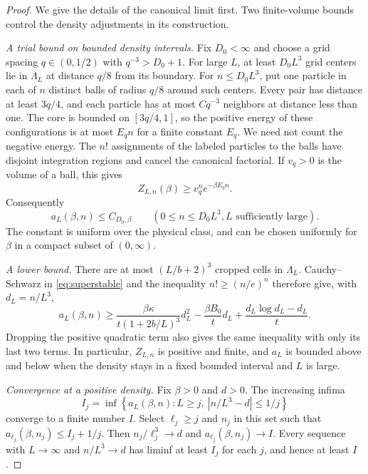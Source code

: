 \begin{proof}
We give the details of the canonical limit first. Two finite-volume
bounds control the density adjustments in its construction.

\emph{A trial bound on bounded density intervals.}
Fix $D_0<\infty$ and choose a grid spacing $q\in(0,1/2)$ with
$q^{-3}>D_0+1$. For large $L$, at least $D_0L^3$ grid centers lie
in $\Lambda_L$ at distance $q/8$ from its boundary. For
$n\le D_0L^3$, put one particle in each of $n$ distinct balls of
radius $q/8$ around such centers. Every pair has distance at least
$3q/4$, and each particle has at most $Cq^{-3}$ neighbors at distance
less than one. The core is bounded on $[3q/4,1]$, so the positive
energy of these configurations is at most $E_q n$ for a finite
constant $E_q$. We need not count the negative energy. The $n!$
assignments of the labeled particles to the balls have disjoint
integration regions and cancel the canonical factorial. If $v_q>0$
is the volume of a ball, this gives
\[
 Z_{L,n}(\beta)\ge v_q^n e^{-\beta E_q n}.
\]
Consequently
\begin{equation}
 a_L(\beta,n)\le C_{D_0,\beta}
 \qquad(0\le n\le D_0L^3, L\text{ sufficiently large}).
 \label{eq:trial-bound}
\end{equation}
The constant is uniform over the physical class, and can be chosen
uniformly for $\beta$ in a compact subset of $(0,\infty)$.

\emph{A lower bound.}
There are at most $(L/b+2)^3$ cropped cells in $\Lambda_L$.
Cauchy--Schwarz in \eqref{eq:superstable} and the inequality
$n!\ge(n/e)^n$ therefore give, with $d_L=n/L^3$,
\begin{equation}
 a_L(\beta,n)
 \ge \frac{\beta\kappa}{t(1+2b/L)^3}d_L^2
       -\frac{\beta B_0}{t}d_L
       +\frac{d_L\log d_L-d_L}{t}.
 \label{eq:finite-coercivity}
\end{equation}
Dropping the positive quadratic term also gives the same inequality
with only its last two terms. In particular, $Z_{L,n}$ is positive
and finite, and $a_L$ is bounded above and below when the density
stays in a fixed bounded interval and $L$ is large.

\emph{Convergence at a positive density.}
Fix $\beta>0$ and $d>0$. The increasing infima
\[
 I_j=\inf\left\{a_L(\beta,n):
       L\ge j,\ \left|n/L^3-d\right|\le1/j\right\}
\]
converge to a finite number $I$. Select $\ell_j\ge j$ and $n_j$
in this set such that $a_{\ell_j}(\beta,n_j)\le I_j+1/j$.
Then $n_j/\ell_j^3\to d$ and
$a_{\ell_j}(\beta,n_j)\to I$. Every sequence with
$L\to\infty$ and $n/L^3\to d$ has liminf at least $I_j$ for
each $j$, and hence at least $I$.


\end{proof}
